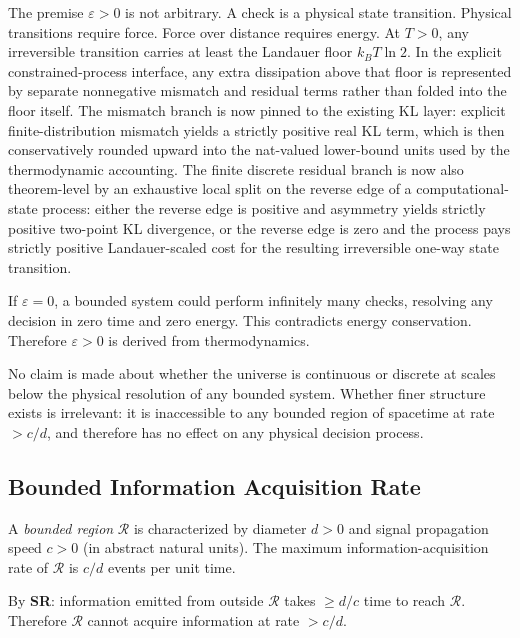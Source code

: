 The premise $\varepsilon > 0$ is not arbitrary. A check is a physical state transition. Physical transitions require force. Force over distance requires energy. At $T > 0$, any irreversible transition carries at least the Landauer floor $k_B T \ln 2$. In the explicit constrained-process interface, any extra dissipation above that floor is represented by separate nonnegative mismatch and residual terms rather than folded into the floor itself. The mismatch branch is now pinned to the existing KL layer: explicit finite-distribution mismatch yields a strictly positive real KL term, which is then conservatively rounded upward into the nat-valued lower-bound units used by the thermodynamic accounting. The finite discrete residual branch is now also theorem-level by an exhaustive local split on the reverse edge of a computational-state process: either the reverse edge is positive and asymmetry yields strictly positive two-point KL divergence, or the reverse edge is zero and the process pays strictly positive Landauer-scaled cost for the resulting irreversible one-way state transition.

If $\varepsilon = 0$, a bounded system could perform infinitely many checks, resolving any decision in zero time and zero energy. This contradicts energy conservation. Therefore $\varepsilon > 0$ is derived from thermodynamics.

\begin{remark}[Scope]
No claim is made about whether the universe is continuous or discrete at scales
below the physical resolution of any bounded system. Whether finer structure
exists is irrelevant: it is inaccessible to any bounded region of spacetime at
rate $> c/d$, and therefore has no effect on any physical decision process.
\end{remark}

\subsection{Bounded Information Acquisition Rate}\label{sec:bounded-acquisition}

\begin{proposition}\label{prop:bounded-region}
A \emph{bounded region} $\mathcal{R}$ is characterized by diameter $d > 0$ and
signal propagation speed $c > 0$ (in abstract natural units). The maximum
information-acquisition rate of $\mathcal{R}$ is $c/d$ events per unit time.

By \textbf{SR}: information emitted from outside $\mathcal{R}$ takes $\geq d/c$
time to reach $\mathcal{R}$. Therefore $\mathcal{R}$ cannot acquire information
at rate $> c/d$.
\end{proposition}

